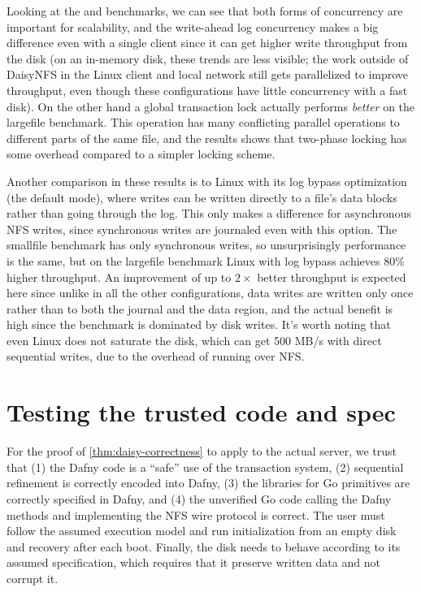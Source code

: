 Looking at the  and  benchmarks, we can see
that both forms of concurrency are important for scalability, and the
write-ahead log concurrency makes a big difference even with a single client
since it can get higher write throughput from the disk (on an in-memory disk,
these trends are less visible; the work outside of DaisyNFS in the Linux client
and local network still gets parallelized to improve throughput, even though
these configurations have little concurrency with a fast disk). On the other
hand a global transaction lock actually performs \emph{better} on the largefile
benchmark. This operation has many conflicting parallel operations to different
parts of the same file, and the results shows that two-phase locking has some
overhead compared to a simpler locking scheme.

Another comparison in these results is to Linux with its log bypass optimization
(the default  mode), where writes can be written directly to a
file's data blocks rather than going through the log. This only makes a difference for asynchronous NFS
writes, since synchronous writes are journaled even with this option. The smallfile benchmark has only
synchronous writes, so unsurprisingly performance is the same, but on the
largefile benchmark Linux with log bypass achieves 80\% higher throughput. An
improvement of up to $2\times$ better throughput is expected here since unlike
in all the other configurations, data writes are written only once rather than
to both the journal and the data region, and the actual benefit is high since
the benchmark is dominated by disk writes. It's worth noting that even Linux
does not saturate the disk, which can get 500 MB/s with direct sequential
writes, due to the overhead of running over NFS.

\section{Testing the trusted code and spec}
\label{sec:eval:testing}

For the proof of \cref{thm:daisy-correctness} to apply to the actual server, we trust that (1) the
Dafny code is a ``safe'' use of the transaction system, (2) sequential
refinement is correctly encoded into Dafny, (3) the libraries for Go primitives
are correctly specified in Dafny, and (4) the unverified Go code calling the
Dafny methods and implementing the NFS wire protocol is correct. The
user must follow the assumed execution model and run initialization from an
empty disk and recovery after each boot. Finally, the disk needs to behave
according to its assumed specification, which requires that it preserve written
data and not corrupt it.


